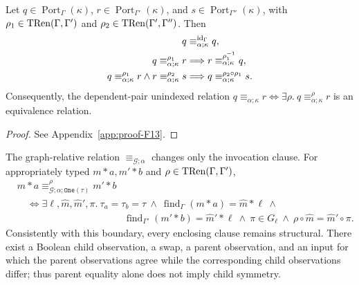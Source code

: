 \begin{proposition}
\label{res:F13}
Let $q\in\operatorname{Port}_\Gamma(\kappa)$,
$r\in\operatorname{Port}_{\Gamma'}(\kappa)$, and
$s\in\operatorname{Port}_{\Gamma''}(\kappa)$, with
$\rho_1\in\operatorname{TRen}(\Gamma,\Gamma')$ and
$\rho_2\in\operatorname{TRen}(\Gamma',\Gamma'')$.  Then
\begin{align*}
q&\equiv_{\alpha;\kappa}^{\operatorname{id}_\Gamma}q,\\
\leanref{TSG-ATOM-015}{TypedSlottedEGraphsPaper.ConcreteAlphaPortClosure.symmetric}
q\equiv_{\alpha;\kappa}^{\rho_1}r
&\Longrightarrow r\equiv_{\alpha;\kappa}^{\rho_1^{-1}}q,\\
\leanref{TSG-ATOM-016}{TypedSlottedEGraphsPaper.ConcreteAlphaPortClosure.transitive}
q\equiv_{\alpha;\kappa}^{\rho_1}r\land
r\equiv_{\alpha;\kappa}^{\rho_2}s
&\Longrightarrow q\equiv_{\alpha;\kappa}^{\rho_2\circ\rho_1}s.
\end{align*}
Consequently, the dependent-pair unindexed relation
$q\equiv_{\alpha;\kappa}r\iff
\exists\rho.\ q\equiv_{\alpha;\kappa}^{\rho}r$ is an equivalence relation.
\end{proposition}
\begin{proof}See Appendix~\ref{app:proof-F13}.\end{proof}

The graph-relative relation $\equiv_{\mathcal G;\alpha}$ changes only the
invocation clause.  For appropriately typed $m*a,m'*b$ and
$\rho\in\operatorname{TRen}(\Gamma,\Gamma')$,
\begin{align*}
&m*a\equiv_{\mathcal G;\alpha;\texttt{One}(\tau)}^{\rho}m'*b\\
&\quad\Longleftrightarrow
\exists\ell,\widehat m,\widehat m',\pi.\ 
\tau_a=\tau_b=\tau\ \land\
\operatorname{find}_\Gamma(m*a)=\widehat m*\ell\ \land\\[-0.2em]
&\hspace{11em}
\operatorname{find}_{\Gamma'}(m'*b)=\widehat m'*\ell\ \land\
\pi\in G_\ell\ \land\
\rho\circ\widehat m=\widehat m'\circ\pi.
\end{align*}
Consistently with this boundary, every enclosing clause remains structural.
There exist a Boolean child observation, a swap, a parent observation, and an input for
which the parent observations agree while the corresponding child observations differ; thus parent equality alone does not imply child symmetry.

